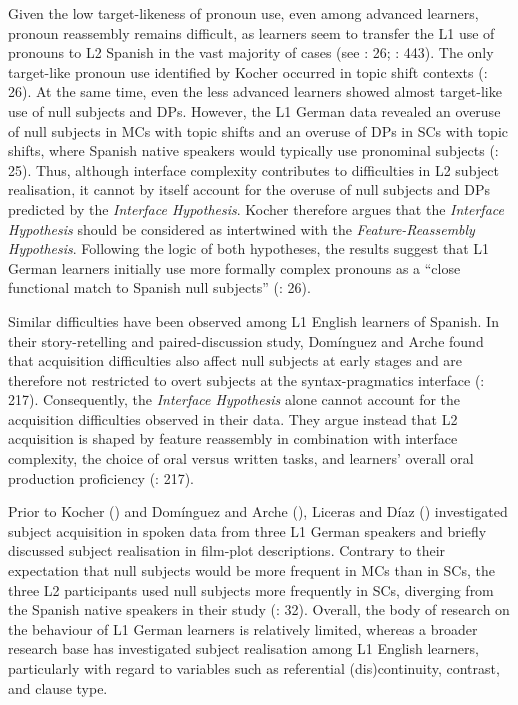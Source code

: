 \documentclass[
  letterpaper,
  DIV=11,
  numbers=noendperiod]{scrartcl}
\begin{document}
Given the low target-likeness of pronoun use, even among advanced
learners, pronoun reassembly remains difficult, as learners seem to
transfer the L1 use of pronouns to L2 Spanish in the vast majority of
cases (see : 26;
: 443). The only target-like pronoun use identified by Kocher
occurred in topic shift contexts
(: 26). At the same
time, even the less advanced learners showed almost target-like use of
null subjects and DPs. However, the L1 German data revealed an overuse
of null subjects in MCs with topic shifts and an overuse of DPs in SCs
with topic shifts, where Spanish native speakers would typically use
pronominal subjects (:
25). Thus, although interface complexity contributes to difficulties in
L2 subject realisation, it cannot by itself account for the overuse of
null subjects and DPs predicted by the \emph{Interface Hypothesis}.
Kocher therefore argues that the \emph{Interface Hypothesis} should be
considered as intertwined with the \emph{Feature-Reassembly Hypothesis}.
Following the logic of both hypotheses, the results suggest that L1
German learners initially use more formally complex pronouns as a
``close functional match to Spanish null subjects''
(: 26).

Similar difficulties have been observed among L1 English learners of
Spanish. In their story-retelling and paired-discussion study, Domínguez
and Arche found that acquisition difficulties also affect null subjects
at early stages and are therefore not restricted to overt subjects at
the syntax-pragmatics interface
(: 217). Consequently, the
\emph{Interface Hypothesis} alone cannot account for the acquisition
difficulties observed in their data. They argue instead that L2
acquisition is shaped by feature reassembly in combination with
interface complexity, the choice of oral versus written tasks, and
learners' overall oral production proficiency
(: 217).

Prior to Kocher () and Domínguez
and Arche (), Liceras and Díaz
() investigated subject
acquisition in spoken data from three L1 German speakers and briefly
discussed subject realisation in film-plot descriptions. Contrary to
their expectation that null subjects would be more frequent in MCs than
in SCs, the three L2 participants used null subjects more frequently in
SCs, diverging from the Spanish native speakers in their study
(: 32).
Overall, the body of research on the behaviour of L1 German learners is
relatively limited, whereas a broader research base has investigated
subject realisation among L1 English learners, particularly with regard
to variables such as referential (dis)continuity, contrast, and clause
type.
\end{document}
